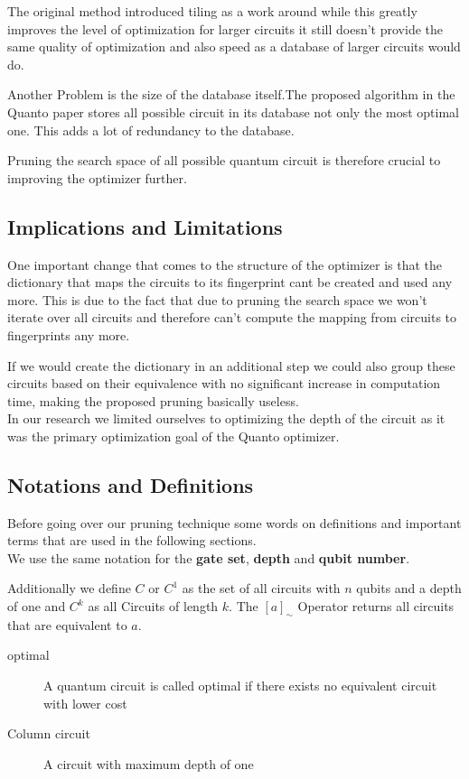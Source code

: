 The original method introduced tiling as a work around while this greatly improves the level of optimization for larger circuits it still doesn't provide the same
quality of optimization and also speed as a database of larger circuits would do. 

Another Problem is the size of the database itself.The proposed algorithm in the Quanto paper stores all possible circuit in its database not only the most optimal one. This adds a lot of redundancy to the database.

Pruning the search space of all possible quantum circuit is therefore crucial to improving the optimizer further. 

\subsection{Implications and Limitations}
One important change that comes to the structure of the optimizer is that the dictionary that maps the circuits to its fingerprint cant be created and used any more. This is due to the fact that due to pruning the search space we won't iterate over all circuits and therefore can't compute the mapping from circuits to fingerprints any more.

If we would create the dictionary in an additional step we could also group these circuits based on their equivalence with no significant increase in computation time, making the proposed pruning basically useless.\\

In our research we limited ourselves to optimizing the depth of the circuit as it was the primary optimization goal of the Quanto optimizer.

\subsection{Notations and Definitions}
Before going over our pruning technique some words on definitions and important terms that are used in the following sections.\\
We use the same notation for the \textbf{gate set}, \textbf{depth} and \textbf{qubit number}. 

Additionally we define $C$ or $C^1$ as the set of all circuits with $n$ qubits and a depth of one and $C^k$ as all Circuits of length $k$. The $[a]_\sim$ Operator returns all circuits that are equivalent to $a$.


 
\begin{description}
	\item[optimal] A quantum circuit is called optimal if there exists no equivalent circuit with lower cost
	
	\item[Column circuit] A circuit with maximum depth of one
\end{description}

